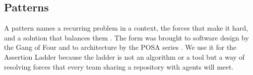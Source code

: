 \subsection{Patterns}

A pattern names a recurring problem in a context, the forces that make it hard, and a solution
that balances them \citep{alexander1977pattern}. The form was brought to software design by the
Gang of Four \citep{gamma1994design} and to architecture by the POSA series
\citep{buschmann1996posa}. We use it for the Assertion Ladder because the ladder is not an
algorithm or a tool but a way of resolving forces that every team sharing a repository with
agents will meet.

